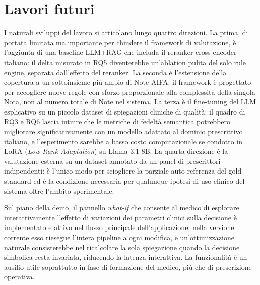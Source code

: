 \section{Lavori futuri}
\label{sec:concl-futuri}

I naturali sviluppi del lavoro si articolano lungo quattro direzioni. La prima, di portata limitata ma importante per chiudere il framework di valutazione, è l'aggiunta di una baseline LLM+RAG che includa il reranker cross-encoder italiano: il delta misurato in RQ5 diventerebbe un'ablation pulita del solo rule engine, separata dall'effetto del reranker. La seconda è l'estensione della copertura a un sottoinsieme più ampio di Note AIFA: il framework è progettato per accogliere nuove regole con sforzo proporzionale alla complessità della singola Nota, non al numero totale di Note nel sistema. La terza è il fine-tuning del LLM esplicativo su un piccolo dataset di spiegazioni cliniche di qualità: il quadro di RQ3 e RQ6 lascia intuire che le metriche di fedeltà semantica potrebbero migliorare significativamente con un modello adattato al dominio prescrittivo italiano, e l'esperimento sarebbe a basso costo computazionale se condotto in LoRA (\emph{Low-Rank Adaptation}) su Llama 3.1 8B. La quarta direzione è la valutazione esterna su un dataset annotato da un panel di prescrittori indipendenti: è l'unico modo per sciogliere la parziale auto-referenza del gold standard ed è la condizione necessaria per qualunque ipotesi di uso clinico del sistema oltre l'ambito sperimentale.

Sul piano della demo, il pannello \emph{what-if} che consente al medico di esplorare interattivamente l'effetto di variazioni dei parametri clinici sulla decisione è implementato e attivo nel flusso principale dell'applicazione; nella versione corrente esso riesegue l'intera pipeline a ogni modifica, e un'ottimizzazione naturale consisterebbe nel ricalcolare la sola spiegazione quando la decisione simbolica resta invariata, riducendo la latenza interattiva. La funzionalità è un ausilio utile soprattutto in fase di formazione del medico, più che di prescrizione operativa.
